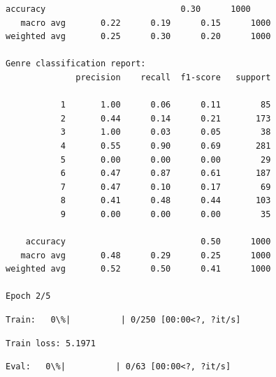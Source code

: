 \documentclass[11pt]{article}
\begin{document}
\begin{Verbatim}[commandchars=\\\{\}]
    accuracy                           0.30      1000
   macro avg       0.22      0.19      0.15      1000
weighted avg       0.25      0.30      0.20      1000

Genre classification report:
              precision    recall  f1-score   support

           1       1.00      0.06      0.11        85
           2       0.44      0.14      0.21       173
           3       1.00      0.03      0.05        38
           4       0.55      0.90      0.69       281
           5       0.00      0.00      0.00        29
           6       0.47      0.87      0.61       187
           7       0.47      0.10      0.17        69
           8       0.41      0.48      0.44       103
           9       0.00      0.00      0.00        35

    accuracy                           0.50      1000
   macro avg       0.48      0.29      0.25      1000
weighted avg       0.52      0.50      0.41      1000

Epoch 2/5
    \end{Verbatim}

    
    \begin{Verbatim}[commandchars=\\\{\}]
Train:   0\%|          | 0/250 [00:00<?, ?it/s]
    \end{Verbatim}

    
    \begin{Verbatim}[commandchars=\\\{\}]
Train loss: 5.1971
    \end{Verbatim}

    
    \begin{Verbatim}[commandchars=\\\{\}]
Eval:   0\%|          | 0/63 [00:00<?, ?it/s]
    \end{Verbatim}
\end{document}
